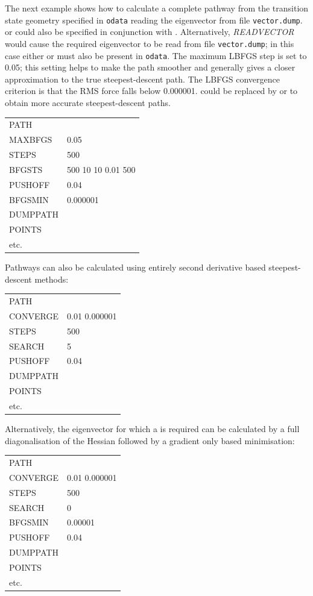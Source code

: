 {{{\noindent The next example shows how to calculate a complete pathway from the transition state geometry
specified in {\tt odata} reading the eigenvector from file {\tt vector.dump}. 
{} or {} could also be specified in conjunction with {}. 
Alternatively, {\it READVECTOR\/} would cause the required eigenvector to be read from 
file {\tt vector.dump}; in this case either {} or {} must
also be present in {\tt odata}.
The maximum LBFGS step is set to 0.05; this setting
helps to make the path smoother and generally gives a closer approximation to the true steepest-descent
path. The LBFGS convergence criterion is that the RMS force falls below 0.000001. {}
could be replaced by {} or {} to obtain more accurate steepest-descent paths.

\medskip
\begin{tabular}{ll}
PATH & \\
MAXBFGS & 0.05 \\
STEPS & 500 \\
BFGSTS & 500 10 10 0.01 500 \\
PUSHOFF & 0.04 \\
BFGSMIN & 0.000001 \\
DUMPPATH \\
POINTS & \\
 etc. \\
\end{tabular}

\noindent Pathways can also be calculated using entirely second derivative based steepest-descent methods:

\medskip
\begin{tabular}{ll}
PATH &\\
CONVERGE& 0.01 0.000001\\
STEPS&  500\\
SEARCH& 5\\
PUSHOFF&  0.04 \\
DUMPPATH& \\
POINTS& \\
etc. & \\
\end{tabular}

\noindent Alternatively, the eigenvector for which a {} is required can be calculated by a full
diagonalisation of the Hessian followed by a gradient only based minimisation:

\medskip
\begin{tabular}{ll}
PATH &\\
CONVERGE& 0.01 0.000001\\
STEPS&  500\\
SEARCH& 0\\
BFGSMIN & 0.00001 \\
PUSHOFF&  0.04 \\
DUMPPATH& \\
POINTS& \\
etc. & \\
\end{tabular}

}}}

